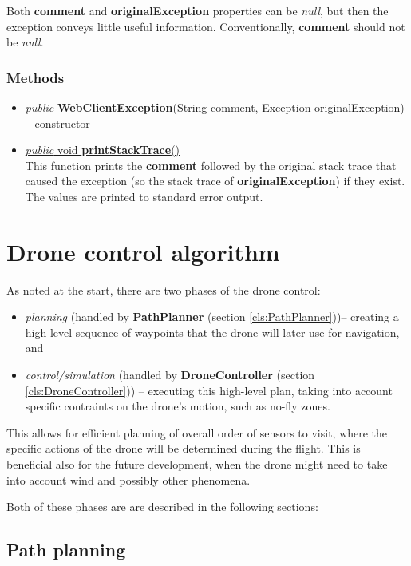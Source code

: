 \documentclass{article}
\newcommand{\sref}[1]{(section \ref{#1})}
\newcommand{\method}[4]{\underline{\textit{#1} #2 \textbf{#3}(#4)}}
\begin{document}
Both \textbf{comment} and \textbf{originalException} properties can be \textit{null}, but then the exception conveys little useful information. Conventionally, \textbf{comment} should not be \textit{null}.

\subsubsection*{Methods}

\begin{itemize}
\item \underline{\textit{public} \textbf{WebClientException}(String comment, Exception originalException)} -- constructor
\item \method{public}{void}{printStackTrace}{} \\
  This function prints the \textbf{comment} followed by the original stack trace that caused the exception (so the stack trace of \textbf{originalException}) if they exist. The values are printed to standard error output.
\end{itemize}

\section{Drone control algorithm}
\label{drone-algorithm}

As noted at the start, there are two phases of the drone control:
\begin{itemize}
\item \textit{planning} (handled by \textbf{PathPlanner} \sref{cls:PathPlanner})-- creating a high-level sequence of waypoints that the drone will later use for navigation, and
\item \textit{control/simulation} (handled by \textbf{DroneController} \sref{cls:DroneController}) -- executing this high-level plan, taking into account specific contraints on the drone's motion, such as no-fly zones.
\end{itemize}

This allows for efficient planning of overall order of sensors to visit, where the specific actions of the drone will be determined during the flight. This is beneficial also for the future development, when the drone might need to take into account wind and possibly other phenomena.

Both of these phases are are described in the following sections:

\subsection{Path planning}
\label{alg:intro}
\end{document}
